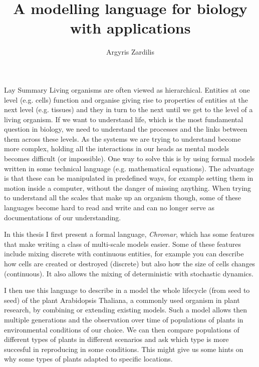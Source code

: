 \documentclass[phd, logo]{infthesis}
\title{A modelling language for biology with applications}
\author{Argyris Zardilis}
\newcommand{\eg}{e.g.\xspace}
\begin{document}
\begin{preliminary}

  \maketitle

  \begin{frontenv}{Lay Summary}{\LARGE}
    Living organisms are often viewed as hierarchical. Entities at one level
    (\eg cells) function and organise giving rise to properties of entities at
    the next level (\eg tissues) and they in turn to the next until we get to
    the level of a living organism. If we want to understand life, which is the
    most fundamental question in biology, we need to understand the processes
    and the links between them across these levels. As the systems we are trying
    to understand become more complex, holding all the interactions in our heads
    as mental models becomes difficult (or impossible). One way to solve this is
    by using formal models written in some technical language (\eg mathematical
    equations). The advantage is that these can be manipulated in predefined
    ways, for example setting them in motion inside a computer, without the
    danger of missing anything. When trying to understand all the scales that
    make up an organism though, some of these languages become hard to read and
    write and can no longer serve as documentations of our understanding.

    In this thesis I first present a formal language, \emph{Chromar}, which has
    some features that make writing a class of multi-scale models easier. Some
    of these features include mixing discrete with continuous entities, for
    example you can describe how cells are created or destroyed (discrete) but
    also how the size of cells changes (continuous). It also allows the
    mixing of deterministic with stochastic dynamics.

    I then use this language to describe in a model the whole lifecycle (from
    seed to seed) of the plant Arabidopsis Thaliana, a commonly used organism in
    plant research, by combining or extending existing models. Such a model
    allows then multiple generations and the observation over time of
    populations of plants in environmental conditions of our choice. We can then
    compare populations of different types of plants in different scenarios and
    ask which type is more succesful in reproducing in some conditions. This
    might give us some hints on why some types of plants adapted to specific
    locations.


\end{frontenv}
\end{preliminary}
\end{document}
